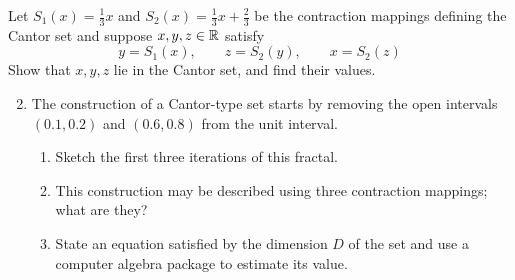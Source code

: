 \begin{exercises}
	\exstart Let $S_1(x)=\frac 13 x$ and $S_2(x)=\frac 13x+\frac 23$ be the contraction mappings defining the Cantor set and suppose $x,y,z\in\mathbb{R}$ satisfy
	\[
		y=S_1(x),\qquad z=S_2(y),\qquad x=S_2(z)
	\]
	Show that $x,y,z$ lie in the Cantor set, and find their values.
	
	  
	\begin{enumerate}\setcounter{enumi}{1}
	  \item The construction of a Cantor-type set starts by removing the open intervals $(0.1,0.2)$ and $(0.6,0.8)$ from the unit interval.
	  \begin{enumerate}
	    \item Sketch the first three iterations of this fractal.
	    \item This construction may be described using three contraction mappings; what are they?
	    \item State an equation satisfied by the dimension $D$ of the set and use a computer algebra package to estimate its value.
	  \end{enumerate}
	  

\end{enumerate}
\end{exercises}
